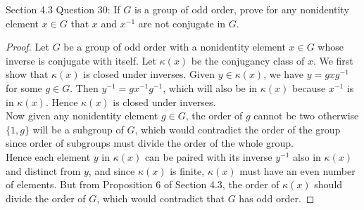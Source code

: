 Section 4.3 Question 30:
If $G$ is a group of odd order, prove for any nonidentity element $x\in G$
that $x$ and $x^{-1}$ are not conjugate in $G$.

\begin{proof}
  Let $G$ be a group of odd order with a nonidentity element $x\in G$ whose
  inverse is conjugate with itself. Let $\kappa(x)$ be the conjugancy class
  of $x$. We first show that $\kappa(x)$ is closed under inverses. Given
  $y\in\kappa(x)$, we have $y=gxg^{-1}$ for some $g\in G$. Then
  $y^{-1}=gx^{-1}g^{-1}$, which will also be in $\kappa(x)$ because
  $x^{-1}$ is in $\kappa(x)$. Hence $\kappa(x)$ is closed under inverses.
  \\
  
  Now given any nonidentity element $g\in G$, the order of $g$ cannot be
  two otherwise $\{1,g\}$ will be a subgroup of $G$, which would contradict
  the order of the group since order of subgroups must divide the order of
  the whole group. \\
  
  Hence each element $y$ in $\kappa(x)$ can be paired with its inverse
  $y^{-1}$ also in $\kappa(x)$ and distinct from $y$, and since $\kappa(x)$
  is finite, $\kappa(x)$ must have an even number of elements. But from
  Proposition 6 of Section 4.3, the order of $\kappa(x)$ should divide the
  order of $G$, which would contradict that $G$ has odd order.
\end{proof}
